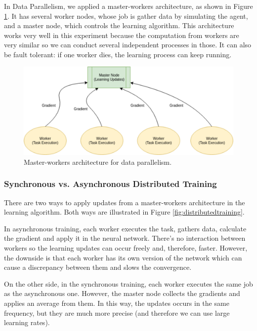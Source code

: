In Data Parallelism, we applied a master-workers architecture, as shown in Figure \ref{fig:master-worker}. It has several worker nodes, whose job is gather data by simulating the agent, and a master node, which controls the learning algorithm. This architecture works very well in this experiment because the computation from workers are very similar so we can conduct several independent processes in those. It can also be fault tolerant: if one worker dies, the learning process can keep running.

\begin{figure}[!htbp]
	\centering
	\includegraphics[width=1.1\textwidth]{Cap5/master-worker.eps}
	\caption{ Master-workers architecture for data parallelism.
	}
	\label{fig:master-worker}
\end{figure}

\subsubsection{Synchronous vs. Asynchronous Distributed Training}

There are two ways to apply updates from a master-workers architecture in the learning algorithm. Both ways are illustrated in Figure \ref{fig:distributedtraining}.

In asynchronous training, each worker executes the task, gathers data, calculate the gradient and apply it in the neural network. There's no interaction between workers so the learning updates can occur freely and, therefore, faster. However, the downside is that each worker has its own version of the network which can cause a discrepancy between them and slows the convergence.

On the other side, in the synchronous training, each worker executes the same job as the asynchronous one. However, the master node collects the gradients and applies an average from them. In this way, the updates occurs in the same frequency, but they are much more precise (and therefore we can use large learning rates). 

